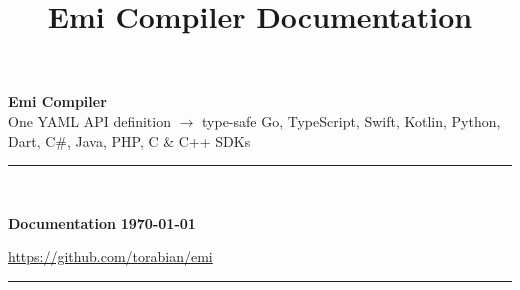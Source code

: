\documentclass[10pt,a4paper]{extarticle}
\title{Emi Compiler Documentation}
\newcommand{\headlinefont}{\normalfont\sffamily\bfseries\selectfont}
\newcommand{\thinrule}{\noindent\textcolor{rulegray}{\rule{\linewidth}{0.4pt}}}
\newcommand{\thickrule}{\noindent\rule{\linewidth}{1.6pt}}
\begin{document}
\thispagestyle{empty}

\begin{center}
  {\headlinefont\fontsize{28}{32}\selectfont Emi Compiler}\\[4pt]
  {\small One YAML API definition \(\rightarrow\) type-safe Go, TypeScript,
  Swift, Kotlin, Python, Dart, C\#, Java, PHP, C \& C++ SDKs}
\end{center}
\thickrule\\[1pt]
\noindent
\begin{minipage}[t]{0.5\linewidth}
  \small\textbf{Documentation} \hfill \textbf{\today}
\end{minipage}
\begin{minipage}[t]{0.5\linewidth}
  \raggedleft\small \url{https://github.com/torabian/emi}
\end{minipage}
\thinrule
\vspace{6pt}
\end{document}
